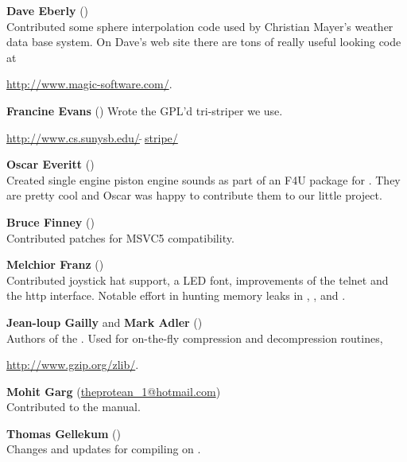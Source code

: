 \noindent \textbf{Dave Eberly}  ()\\
  Contributed some sphere interpolation code used by Christian Mayer's
  weather data base system.  On Dave's web site there are tons of
  really useful looking code at
  \medskip

\href{http://www.magic-software.com/}{http://www.magic-software.com/}.
  \medskip

\noindent \textbf{Francine Evans} ()
  Wrote the GPL'd tri-striper we use.
  \medskip

\href{http://www.cs.sunysb.edu/~stripe/}{http://www.cs.sunysb.edu/$\tilde{~~}$stripe/}
\medskip

\noindent \textbf{Oscar Everitt} ()\\
  Created single engine piston engine sounds as part of an F4U package
  for .  They are pretty cool and Oscar was happy to contribute
  them to our little project.
 \medskip

\noindent \textbf{Bruce Finney} ()\\
  Contributed patches for MSVC5 compatibility.
 \medskip

\noindent \textbf{Melchior Franz} ()\\
  Contributed joystick hat support, a LED font, improvements of the telnet and the http interface. Notable effort in hunting memory leaks in \FlightGear{}, \SimGear{}, and \JSBSim{}.
  \medskip

\noindent \textbf{Jean-loup Gailly} and \textbf{Mark
Adler} ()\\
  Authors of the .  Used for on-the-fly compression and
  decompression routines,

  \href{http://www.gzip.org/zlib/}{http://www.gzip.org/zlib/}.
 \medskip

\noindent \textbf{Mohit Garg}
(\href{mailto:theprotean_1@hotmail.com}{theprotean\_1@hotmail.com})\\
 Contributed to the manual.
 \medskip

\noindent \textbf{Thomas Gellekum}
()\\
  Changes and updates for compiling on .
 \medskip

